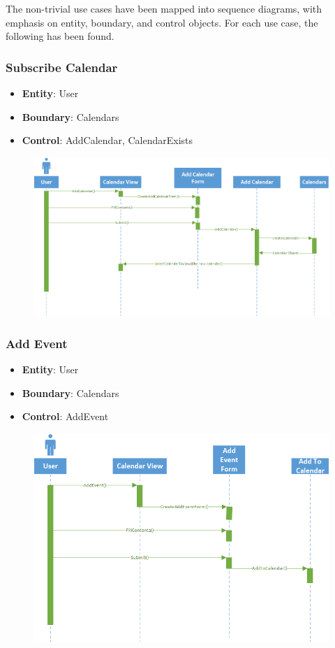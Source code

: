 The non-trivial use cases have been mapped into sequence diagrams, with emphasis
on entity, boundary, and control objects. For each use case, the following has
been found.

\subsubsection{Subscribe Calendar}
\begin{itemize}
\item \textbf{Entity}: User
\item \textbf{Boundary}: Calendars
\item \textbf{Control}: AddCalendar, CalendarExists
\end{itemize}

\begin{figure}[h]
\includegraphics[scale=0.8]{figures/subscribe.png}
\end{figure}

\subsubsection{Add Event}
\begin{itemize}
\item \textbf{Entity}: User
\item \textbf{Boundary}: Calendars
\item \textbf{Control}: AddEvent
\end{itemize}

\clearpage
\begin{figure}[h]
\includegraphics[scale=0.8]{figures/addevent.png}
\end{figure}

